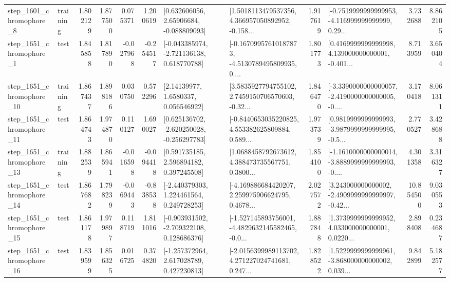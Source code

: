 \begin{tabular}{llrrrrllrlrr}
  step\_1601\_chromophore\_8 &  training &      1.802129 &    1.877500 &      0.075371 &  1.200619 &     [0.632606056, 2.65906684, -0.088809093] &  [1.5018113479537356, 4.366957050892952, -0.158... &       1.917619 &  [-0.7519999999999953, -4.116999999999999, 0.29... &            3.732688 &          8.862105 \\
  step\_1651\_chromophore\_1 &      test &      1.845858 &    1.817890 &     -0.027968 & -0.254517 &   [-0.043385974, -2.721136138, 0.618770788] &  [-0.16709957610187873, -4.5130789495809935, 0.... &       1.801773 &  [0.4169999999999998, 4.139000000000001, -0.401... &            8.713959 &          3.650404 \\
 step\_1651\_chromophore\_10 &  training &      1.867437 &    1.898186 &      0.030750 &  0.572296 &        [2.14139977, 1.6580337, 0.056546922] &  [3.5835927794755102, 2.7459150706570603, -0.32... &       1.846470 &  [-3.3390000000000057, -2.4190000000000005, -0.... &            3.170418 &          8.061311 \\
 step\_1651\_chromophore\_11 &      test &      1.864743 &    1.974870 &      0.110127 &  1.690027 &   [0.625136702, -2.620250028, -0.256297783] &  [-0.8440653035220825, 4.553382625809884, 0.589... &       1.973739 &  [0.9819999999999993, -3.9879999999999995, -0.5... &            2.770527 &          3.428688 \\
 step\_1651\_chromophore\_13 &  training &      1.882539 &    1.865941 &     -0.016598 & -0.094418 &     [0.591735185, 2.596894182, 0.397245508] &  [1.0688458792673612, 4.388473735567751, 0.3800... &       1.854100 &  [-1.1610000000000014, -3.8889999999999993, -0.... &            4.301358 &          3.316327 \\
 step\_1651\_chromophore\_14 &      test &      1.867682 &    1.798239 &     -0.069443 & -0.838538 &    [-2.440379303, 1.224461564, 0.249728253] &  [-4.169886684420207, 2.259975906624795, 0.4678... &       2.027572 &  [3.243000000000002, -2.4909999999999997, -0.42... &           10.854500 &          9.030553 \\
 step\_1651\_chromophore\_15 &      test &      1.861178 &    1.979897 &      0.118719 &  1.811016 &   [-0.903931502, -2.709322108, 0.128686376] &  [-1.527145893756001, -4.4829632145582465, -0.0... &       1.887848 &  [1.3739999999999952, 4.033000000000001, 0.0220... &            2.898408 &          0.234687 \\
 step\_1651\_chromophore\_16 &      test &      1.839599 &    1.856325 &      0.016725 &  0.374820 &    [-1.257372964, 2.617028789, 0.427230813] &  [-2.0156399989113702, 4.271227024741681, 0.247... &       1.828522 &  [1.5229999999999961, -3.868000000000002, 0.039... &            9.842899 &          5.182577 \\

\end{tabular}
